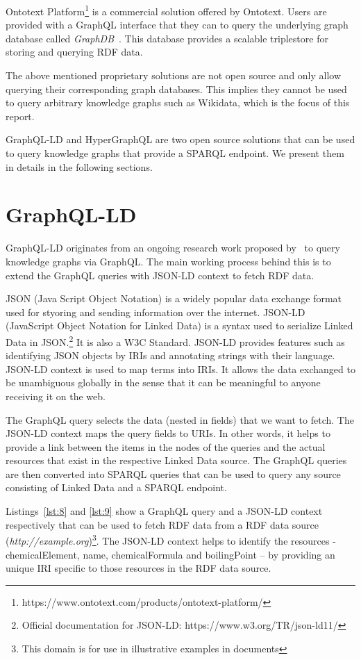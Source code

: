 Ontotext Platform\footnote{https://www.ontotext.com/products/ontotext-platform/} is a commercial solution offered by Ontotext. Users are provided with a GraphQL interface that they can to query the underlying graph database called \textit{GraphDB}~\cite{Angele2022}. This database provides a scalable triplestore for storing and querying RDF data.

The above mentioned proprietary solutions are not open source and only allow querying their corresponding graph databases. This implies they cannot be used to query arbitrary knowledge graphs such as Wikidata, which is the focus of this report.

GraphQL-LD and HyperGraphQL are two open source solutions that can be used to query knowledge graphs that provide a SPARQL endpoint. We present them in details in the following sections.

\section{GraphQL-LD}

GraphQL-LD originates from an ongoing research work proposed by~\cite{Taelman2018} to query knowledge graphs via GraphQL. The main working process behind this is to extend the GraphQL queries with JSON-LD context to fetch RDF data. 

JSON (Java Script Object Notation) is a widely popular data exchange format used for styoring and sending information over the internet. JSON-LD (JavaScript Object Notation for Linked Data) is a syntax used to serialize Linked Data in JSON.\footnote{Official documentation for JSON-LD: https://www.w3.org/TR/json-ld11/} It is also a W3C Standard. JSON-LD provides features such as identifying JSON objects by IRIs and annotating strings with their language. JSON-LD context is used to map terms into IRIs. It allows the data exchanged to be unambiguous globally in the sense that it can be meaningful to anyone receiving it on the web.   

The GraphQL query selects the data (nested in fields) that we want to fetch. The JSON-LD context maps the query fields to URIs. In other words, it helps to provide a link between the items in the nodes of the queries and the actual resources that exist in the respective Linked Data source. The GraphQL queries are then converted into SPARQL queries that can be used to query any source consisting of Linked Data and a SPARQL endpoint.

Listings~\ref{lst:8} and  \ref{lst:9} show a GraphQL query and a JSON-LD context respectively that can be used to fetch RDF data from a RDF data source (\textit{http://example.org})\footnote{This domain is for use in illustrative examples in documents}. The JSON-LD context helps to identify the resources - chemicalElement, name, chemicalFormula and boilingPoint – by providing an unique IRI specific to those resources in the RDF data source.

